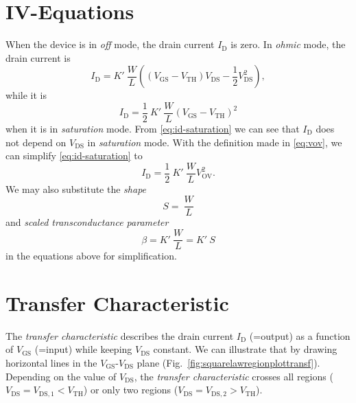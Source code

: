 \documentclass{article}[11pt]
\begin{document}
\section{IV-Equations}

When the device is in \textit{off} mode, the drain current $I_{\mathrm{D}}$
is zero.
In \textit{ohmic} mode, the drain current is
\begin{equation}\label{eq:id-ohmic}
  I_{\mathrm{D}} =  K' \ \frac{W}{L} 
    \left((V_{\mathrm{GS}}-V_{\mathrm{TH}})V_{\mathrm{DS}} 
      - \frac{1}{2} V_{\mathrm{DS}}^2\right),
\end{equation}
while it is 
\begin{equation}\label{eq:id-saturation}
  I_{\mathrm{D}} = \frac{1}{2} \ K' \ \frac{W}{L} (V_{\mathrm{GS}}-V_{\mathrm{TH}})^2
\end{equation}
when it is in \textit{saturation} mode.
From \eqref{eq:id-saturation} we can see that $I_{\mathrm{D}}$ does 
not depend on $V_{\mathrm{DS}}$ in \textit{saturation} mode.
With the definition made in \eqref{eq:vov}, we can simplify 
\eqref{eq:id-saturation} to
\begin{equation}\label{eq:id-saturation-vov}
I_{\mathrm{D}} = \frac{1}{2} \ K' \ \frac{W}{L} V_{\mathrm{OV}}^2.
\end{equation}
We may also substitute the \textit{shape}
\begin{equation}\label{eq:shape}
S = \ \frac{W}{L}
\end{equation}
and \textit{scaled transconductance parameter}
\begin{equation}\label{eq:beta}
\beta = K' \ \frac{W}{L} = K' \ S
\end{equation}
in the equations above for simplification.

\section{Transfer Characteristic}

The \textit{transfer characteristic} describes the drain current 
$I_{\mathrm{D}}$ (=output) as a function of $V_{\mathrm{GS}}$ (=input) 
while keeping $V_{\mathrm{DS}}$ constant.
We can illustrate that by drawing horizontal lines in the 
$V_{\mathrm{GS}}$-$V_{\mathrm{DS}}$ plane 
(Fig.~\ref{fig:squarelawregionplottransf}).
Depending on the value of $V_{\mathrm{DS}}$, the 
\textit{transfer characteristic} 
crosses all regions ($V_{\mathrm{DS}}=V_{\mathrm{DS,1}} < V_{\mathrm{TH}}$)
or only two regions ($V_{\mathrm{DS}}=V_{\mathrm{DS,2}} > V_{\mathrm{TH}}$).
\end{document}
